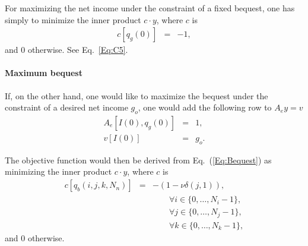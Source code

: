 \documentclass{article}[fleqn,12pt]
\begin{document}
For maximizing the net income under the constraint of a fixed bequest, one has simply to
minimize the inner product $c\cdot y$, where $c$ is
\begin{eqnarray}
	c[q_g(0)] &=& -1,
\end{eqnarray}
and 0 otherwise. See Eq.~\ref{Eq:C5}.

\paragraph*{Maximum bequest}
If, on the other hand, one would like to maximize the bequest under the constraint of a desired net income $g_o$,
one would add the following row to $A_ey = v$
\begin{eqnarray}
	\label{Eq:FixedIncome}
	A_e[I(0), q_g(0)] &=& 1, \nonumber \\
	v[I(0)] &=& g_o.
\end{eqnarray}

The objective function would then be derived from Eq.~(\ref{Eq:Bequest}) as
minimizing the inner product $c\cdot y$, where $c$ is
\begin{eqnarray}
	\label{Eq:MaxBequest}
	c[q_b(i, j, k, N_n)] &=& -(1 - \nu\delta(j, 1)),\\
	&&\qquad\forall i \in \{0,\ldots, N_i-1\},\nonumber\\
	&&\qquad\forall j \in \{0,\ldots, N_j-1\},\nonumber\\
	&&\qquad\forall k \in \{0,\ldots, N_k-1\},\nonumber
\end{eqnarray}
and 0 otherwise.
\end{document}

